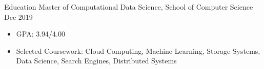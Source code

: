 \begin{MySection}{Education}
    {Master of Computational Data Science,
        \textnormal{School of Computer Science}
    }{Dec 2019}
    \begin{itemize}
        \item 
        GPA: 3.94/4.00%
        \item Selected Coursework:
        Cloud Computing,
        Machine Learning,
        Storage Systems,
        Data Science,
        Search Engines,
        Distributed Systems
    \end{itemize}

    \vspace{0.1pt}

\vspace{-0.15in}

\end{MySection}